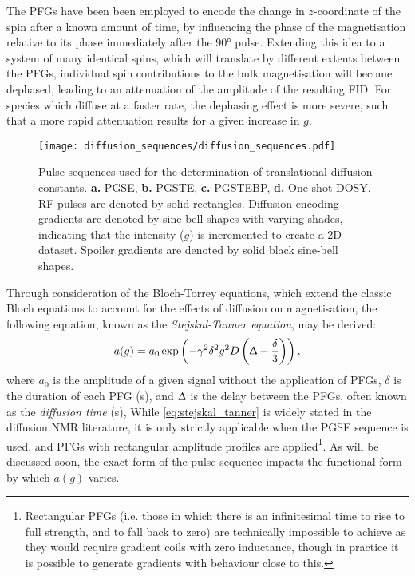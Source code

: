 The \acp{PFG} have been been employed to encode the change in
$z$-coordinate of the spin after a known amount of time, by influencing the
phase of the magnetisation relative to its phase immediately after the \ang{90}
pulse.
Extending this idea to a system of many identical spins, which will translate
by different extents between the \acp{PFG}, individual spin contributions to
the bulk magnetisation will become dephased, leading to an attenuation of the
amplitude of the resulting \ac{FID}. For species which diffuse at a faster
rate, the dephasing effect is more severe, such that a more rapid attenuation
results for a given increase in $g$.

\begin{figure}
   \texttt{[image: diffusion\_sequences/diffusion\_sequences.pdf]}
   \caption[
       Pulse sequences used for the determination of translational diffusion constants.
   ]{
       Pulse sequences used for the determination of translational diffusion constants.
       \textbf{a.} \acs{PGSE},
       \textbf{b.} \acs{PGSTE},
       \textbf{c.} \acs{PGSTEBP},
       \textbf{d.} One-shot DOSY.
       \ac{RF} pulses are denoted by solid rectangles. Diffusion-encoding
       gradients are denoted by sine-bell shapes with varying shades,
       indicating that the intensity ($g$) is incremented to create a \ac{2D}
       dataset. Spoiler gradients are denoted by solid black sine-bell shapes.
   }
   \label{fig:diffusion_sequences}
\end{figure}

Through consideration of the Bloch-Torrey equations\cite{Torrey1956}, which
extend the classic Bloch equations to account for the effects of diffusion on
magnetisation, the following equation, known as the \emph{Stejskal-Tanner
equation}, may be derived:
\begin{equation}
    a(g) = a_0 \exp \left(- \gamma^2 \delta^2 g^2 D \left(\Updelta -
    \frac{\delta}{3}\right)\right),
    \label{eq:stejskal_tanner}
\end{equation}
where
$a_0$ is the amplitude of a given signal without the application of \acp{PFG},
$\delta$ is the duration of each \ac{PFG} (\unit{\second}), and
$\Updelta$ is the delay between the \acp{PFG}, often known as the \emph{diffusion time}
(\unit{\second}),
While \cref{eq:stejskal_tanner} is widely stated in the diffusion \ac{NMR}
literature, it is only strictly applicable when the \ac{PGSE} sequence is used,
and \acp{PFG} with rectangular amplitude profiles are applied\footnote{
    Rectangular \acp{PFG} (i.e. those in which there is an infinitesimal time
    to rise to full strength, and to fall back to zero) are technically
    impossible to achieve as they would require gradient coils with zero
    inductance, though in practice it is possible to generate gradients with
    behaviour close to this.
}. As will be discussed soon, the exact form of the pulse sequence impacts the
functional form by which $a(g)$ varies.

